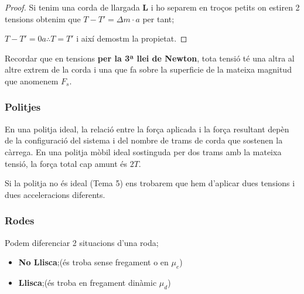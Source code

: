 \documentclass[12pt]{article}
\begin{document}
\begin{proof}
    Si tenim una corda de llargada \textbf{L} i ho separem en troços petits on estiren 2 tensions obtenim que $T - T' = \Delta m\cdot a$ per tant;
    
    \begin{center}
    \end{center}

    $T-T' = 0a \therefore T = T'$ i així demostm la propietat.
\end{proof}

Recordar que en tensions \textbf{per la 3ª llei de Newton}, tota tensió té una altra al altre extrem de la corda i una que fa sobre la superficie de la mateixa magnitud que anomenem $F_s$.

\subsubsection{Politjes}

En una politja ideal, la relació entre la força aplicada i la força resultant depèn de la configuració del sistema i del nombre de trams de corda que sostenen la càrrega. En una politja mòbil ideal sostinguda per dos trams amb la mateixa tensió, la força total cap amunt és \(2T\).

Si la politja no és ideal (Tema 5) ens trobarem que hem d'aplicar dues tensions i dues acceleracions diferents.

\subsubsection{Rodes}

Podem diferenciar 2 situacions d'una roda;

\begin{itemize}
    \item \textbf{No Llisca};(és troba sense fregament o en $\mu_e$)
    \item \textbf{Llisca};(és troba en fregament dinàmic $\mu_d$)
\end{itemize}
\end{document}
